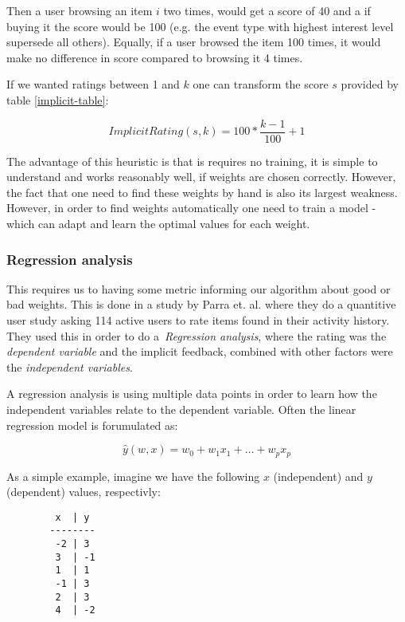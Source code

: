 Then a user browsing an item $i$ two times, would get a score of 40 and a if
buying it the score would be 100 (e.g. the event type with highest interest
level supersede all others). Equally, if a user browsed the item 100 times, it
would make no difference in score compared to browsing it 4 times.

If we wanted ratings between 1 and $k$ one can transform the score $s$ provided
by table \ref{implicit-table}:

\begin{equation}
  ImplicitRating(s, k) = 100 * \frac{k-1}{100} + 1 
\end{equation}

The advantage of this heuristic is that is requires no training, it is simple
to understand and works reasonably well, if weights are chosen correctly.
However, the fact that one need to find these weights by hand is also its
largest weakness. However, in order to find weights automatically one need to
train a model - which can adapt and learn the optimal values for each weight.

\subsubsection{Regression analysis}

This requires us to having some metric informing our algorithm about good or
bad weights. This is done in a study by Parra et. al. \cite{parra2011walk}
where they do a quantitive user study asking 114 active users to rate items
found in their activity history. They used this in order to do
a \textit{Regression analysis}, where the rating was the \textit{dependent
variable} and the implicit feedback, combined with other factors were the
\textit{independent variables}.

A regression analysis is using multiple data points in order to learn how the
independent variables relate to the dependent variable. Often the linear
regression model is forumulated as:

\begin{equation}
  \label{eq-regression}
  \hat{y}(w,x) = w_0 + w_1 x_1 + \dots + w_p x_p
\end{equation}

As a simple example, imagine we have the following $x$ (independent) and $y$
(dependent) values, respectivly:

\begin{figure}[H]
  \centering
  \begin{BVerbatim}
   x  | y  
  --------
   -2 | 3
   3  | -1
   1  | 1
   -1 | 3
   2  | 3
   4  | -2
  \end{BVerbatim}
\end{figure}

